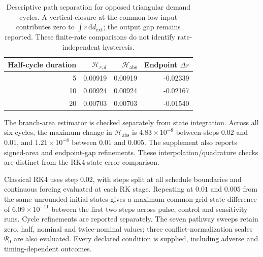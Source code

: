 \begin{table}[H]\centering\small

\begin{tabular}{@{}rrrr@{}}\toprule

Half-cycle duration & $\mathcal H_{r,d}$ & $\mathcal H_{\mathrm{abs}}$ & Endpoint $\Delta r$ \\\midrule

5 & 0.00919 & 0.00919 & -0.02339 \\

10 & 0.00924 & 0.00924 & -0.02167 \\

20 & 0.00703 & 0.00703 & -0.01540 \\

\bottomrule\end{tabular}

\caption{Descriptive path separation for opposed triangular demand cycles. A vertical closure at the common low input contributes zero to $\int r\,\mathrm d d_{\mathrm{ext}}$; the output gap remains reported. These finite-rate comparisons do not identify rate-independent hysteresis.}\label{tab:cycle-statistics}\end{table}

The branch-area estimator is checked separately from state integration. Across all six cycles, the maximum change in $\mathcal H_{\mathrm{abs}}$ is $4.83\times10^{-8}$ between steps $0.02$ and $0.01$, and $1.21\times10^{-8}$ between $0.01$ and $0.005$. The supplement also reports signed-area and endpoint-gap refinements. These interpolation/quadrature checks are distinct from the RK4 state-error comparison.

Classical RK4 uses step $0.02$, with steps split at all schedule boundaries and continuous forcing evaluated at each RK stage. Repeating at $0.01$ and $0.005$ from the same unrounded initial states gives a maximum common-grid state difference of $6.09\times10^{-11}$ between the first two steps across pulse, control and sensitivity runs. Cycle refinements are reported separately. The seven pathway sweeps retain zero, half, nominal and twice-nominal values; three conflict-normalization scales $\Psi_0$ are also evaluated. Every declared condition is supplied, including adverse and timing-dependent outcomes.
